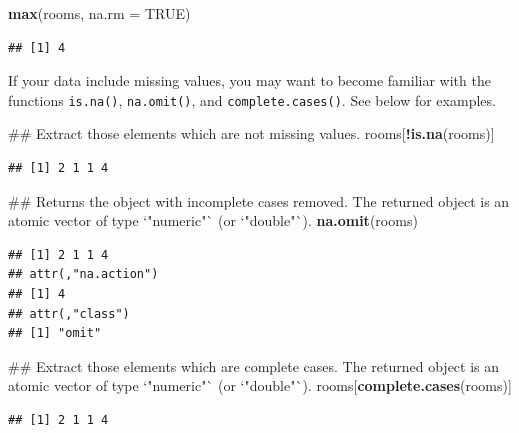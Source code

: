 \documentclass[]{book}
\newenvironment{Shaded}{\begin{snugshade}}{\end{snugshade}}
\newcommand{\KeywordTok}[1]{\textcolor[rgb]{0.13,0.29,0.53}{\textbf{#1}}}
\newcommand{\DataTypeTok}[1]{\textcolor[rgb]{0.13,0.29,0.53}{#1}}
\newcommand{\OtherTok}[1]{\textcolor[rgb]{0.56,0.35,0.01}{#1}}
\newcommand{\OperatorTok}[1]{\textcolor[rgb]{0.81,0.36,0.00}{\textbf{#1}}}
\newcommand{\NormalTok}[1]{#1}
\begin{document}
\begin{Shaded}
\begin{Highlighting}[]
\KeywordTok{max}\NormalTok{(rooms, }\DataTypeTok{na.rm =} \OtherTok{TRUE}\NormalTok{)}
\end{Highlighting}
\end{Shaded}

\begin{verbatim}
## [1] 4
\end{verbatim}

If your data include missing values, you may want to become familiar
with the functions \texttt{is.na()}, \texttt{na.omit()}, and
\texttt{complete.cases()}. See below for examples.

\begin{Shaded}
\begin{Highlighting}[]
\NormalTok{## Extract those elements which are not missing values.}
\NormalTok{rooms[}\OperatorTok{!}\KeywordTok{is.na}\NormalTok{(rooms)]}
\end{Highlighting}
\end{Shaded}

\begin{verbatim}
## [1] 2 1 1 4
\end{verbatim}

\begin{Shaded}
\begin{Highlighting}[]
\NormalTok{## Returns the object with incomplete cases removed. The returned object is an atomic vector of type `"numeric"` (or `"double"`).}
\KeywordTok{na.omit}\NormalTok{(rooms)}
\end{Highlighting}
\end{Shaded}

\begin{verbatim}
## [1] 2 1 1 4
## attr(,"na.action")
## [1] 4
## attr(,"class")
## [1] "omit"
\end{verbatim}

\begin{Shaded}
\begin{Highlighting}[]
\NormalTok{## Extract those elements which are complete cases. The returned object is an atomic vector of type `"numeric"` (or `"double"`).}
\NormalTok{rooms[}\KeywordTok{complete.cases}\NormalTok{(rooms)]}
\end{Highlighting}
\end{Shaded}

\begin{verbatim}
## [1] 2 1 1 4
\end{verbatim}
\end{document}
